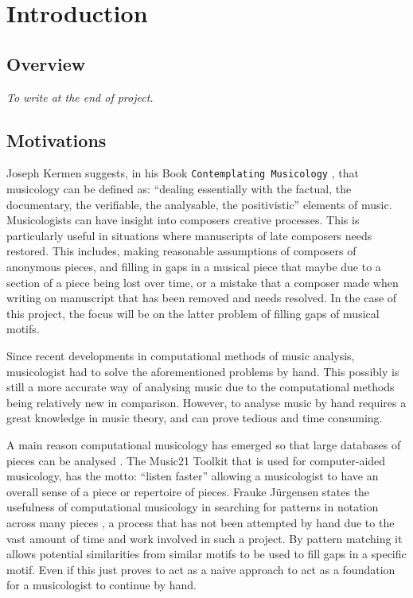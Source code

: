 \chapter{Introduction\label{chap:introduction}}

\section{Overview}

\textit{To write at the end of project.}

\section{Motivations}

Joseph Kermen suggests, in his Book \texttt{Contemplating Musicology} \citep{kerman2009contemplating}, that musicology can be defined as: ``dealing essentially with the factual, the documentary, the verifiable, the analysable, the positivistic'' elements of music. Musicologists can have insight into composers creative processes. This is particularly useful in situations where manuscripts of late composers needs restored. This includes, making reasonable assumptions of composers of anonymous pieces, and filling in gaps in a musical piece that maybe due to a section of a piece being lost over time, or a mistake that a composer made when writing on manuscript that has been removed and needs resolved. In the case of this project, the focus will be on the latter problem of filling gaps of musical motifs. 

Since recent developments in computational methods of music analysis, musicologist had to solve the aforementioned problems by hand. This possibly is still a more accurate way of analysing music due to the computational methods being relatively new in comparison. However, to analyse music by hand requires a great knowledge in music theory, and can prove tedious and time consuming.

A main reason computational musicology has emerged so that large databases of pieces can be analysed \citep{cook2004computational}. The Music21 Toolkit \citep{cuthbert2010music21} that is used for computer-aided musicology, has the motto: ``listen faster'' allowing a musicologist to have an overall sense of a piece or repertoire of pieces. Frauke J{\"u}rgensen states the usefulness of computational musicology in searching for patterns in notation across many pieces \citep{jurgensen2015partial}, a process that has not been attempted by hand due to the vast amount of time and work involved in such a project. By pattern matching it allows potential similarities from similar motifs to be used to fill gaps in a specific motif. Even if this just proves to act as a naive approach to act as a foundation for a musicologist to continue by hand.

